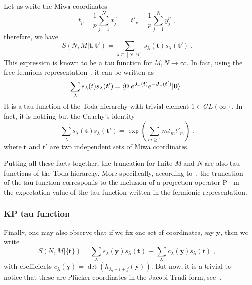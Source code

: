 \documentclass[a4paper,11pt]{amsart}
\begin{document}
Let us write the Miwa coordinates 
\begin{equation}
  t_p = \frac{1}{p}\sum_{j=1}^N x_j^p\qquad 
  t'_p = \frac{1}{p}\sum_{j=1}^N y_j^p\; ,
\end{equation}
therefore, we have 
\begin{equation}
  S(N, M|\bm{t}, \bm{t}') = \sum_{\lambda\subseteq [N,M]} s_\lambda(\bm{t}) s_\lambda(\bm{t}') \; .
\end{equation}
This expression is known to be a tau function for \(M, N\to \infty\).
In fact, using the free fermions representation~\cite{Alexandrov:2012tr},
it can be written as
\begin{equation}
\sum_{\lambda } s_{\lambda}(\bm{t}) s_{\lambda}(\bm{t}')
 = \langle\bm{0}\rvert e^{\bm{J}_+(\bm{t})} e^{-\bm{J}_-(\bm{t}')} \lvert\bm{0}\rangle\; .
\end{equation}
It is a tau function of the Toda hierarchy with trivial element \(1 \in GL(\infty)\).
In fact, it is nothing but the Cauchy's identity
\begin{equation}
  \sum_{\lambda } s_{\lambda}(\bm{t}) s_{\lambda}(\bm{t}')
    = \exp \left( \sum_{m\geq1} m t_m t'_m \right) \; .
\end{equation}
where \(\bm{t}\) and \(\bm{t}'\) are two independent sets of Miwa coordinates.

Putting all these facts together, the truncation for finite \(M\) and
\(N\) are also tau functions of the Toda hierarchy. More specifically,
according to~\cite{Alexandrov:2012tr, Kharchev:1991gd,
  Zabrodin:2010ii}, the truncation of the tau function corresponds to
the inclusion of a projection operator \(\mathrm{P}^+\) in the
expectation value of the tau function written in the fermionic
representation.

\subsubsection{KP tau function}
Finally, one may also observe that if we fix one set of coordinates,
say \(\bm{y}\), then we write
\begin{equation}
 S(N,M|\{\bm{t}\}) 
 = \sum_{\lambda} s_\lambda(\bm{y})  s_\lambda(\bm{t}) 
 \equiv \sum_{\lambda} c_\lambda(\bm{y})  s_\lambda(\bm{t}) \; ,
\end{equation}
with coefficients \(c_\lambda(\bm{y}) = \det (h_{\lambda_i-i +j}(\bm{y}))\).
But now, it is a trivial to notice that these are Plücker
coordinates in the Jacobi-Trudi form, see~\cite{Miwa2000, Alexandrov:2012tr}. 
\end{document}
